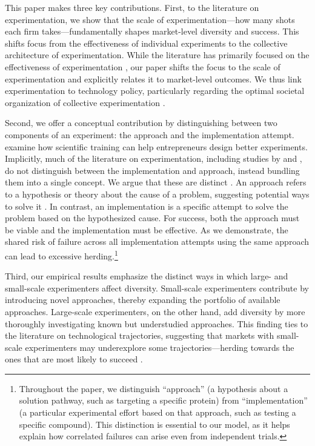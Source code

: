 This paper makes three key contributions. First, to the literature on experimentation, we show that the scale of experimentation---how many shots each firm takes---fundamentally shapes market-level diversity and success. This shifts focus from the effectiveness of individual experiments to the collective architecture of experimentation. While the literature has primarily focused on the effectiveness of experimentation \citep{koning2022experimentation}, our paper shifts the focus to the scale of experimentation and explicitly relates it to market-level outcomes. We thus link experimentation to technology policy, particularly regarding the optimal societal organization of collective experimentation \citep{nelson1961uncertainty}.

Second, we offer a conceptual contribution by distinguishing between two components of an experiment: the approach and the implementation attempt. \citet{camuffo2024scientific} examine how scientific training can help entrepreneurs design better experiments. Implicitly, much of the literature on experimentation, including studies by \citet{koning2022experimentation} and \citet{gans2019foundations}, do not distinguish between the implementation and approach, instead bundling them into a single concept. We argue that these are distinct \citep{bryan2017direction, dasgupta1987simple}. An approach refers to a hypothesis or theory about the cause of a problem, suggesting potential ways to solve it \citep{sorenson2024theory}. In contrast, an implementation is a specific attempt to solve the problem based on the hypothesized cause. For success, both the approach must be viable and the implementation must be effective. As we demonstrate, the shared risk of failure across all implementation attempts using the same approach can lead to excessive herding.\footnote{Throughout the paper, we distinguish ``approach'' (a hypothesis about a solution pathway, such as targeting a specific protein) from ``implementation'' (a particular experimental effort based on that approach, such as testing a specific compound). This distinction is essential to our model, as it helps explain how correlated failures can arise even from independent trials.}

Third, our empirical results emphasize the distinct ways in which large- and small-scale experimenters affect diversity. Small-scale experimenters contribute by introducing novel approaches, thereby expanding the portfolio of available approaches. Large-scale experimenters, on the other hand, add diversity by more thoroughly investigating known but understudied approaches. This finding ties to the literature on technological trajectories, suggesting that markets with small-scale experimenters may underexplore some trajectories---herding towards the ones that are most likely to succeed \citep{ciarli2021digital, nelson2023if, tan2023road}.

